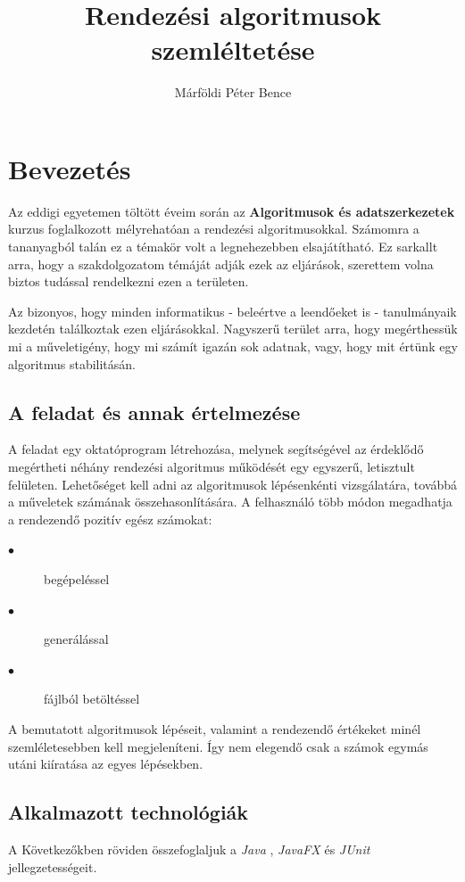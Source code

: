 \documentclass{elteikthesis}
\title{Rendezési algoritmusok szemléltetése}
\author{Márföldi Péter Bence}
\begin{document}
\frontmatter

	\maketitle
	\renewcommand{\thepage}{}
	\tableofcontents
	
\mainmatter
	\pagestyle{fancy}

\chapter{Bevezetés} 
 Az eddigi egyetemen töltött éveim során az \textbf{Algoritmusok és adatszerkezetek} kurzus foglalkozott mélyrehatóan a rendezési algoritmusokkal. Számomra a tananyagból talán ez a témakör volt a legnehezebben elsajátítható. Ez sarkallt arra, hogy a szakdolgozatom témáját adják ezek az eljárások, szerettem volna biztos tudással rendelkezni ezen a területen.\par
 Az bizonyos, hogy minden informatikus - beleértve a leendőeket is - tanulmányaik kezdetén találkoztak ezen eljárásokkal. Nagyszerű terület arra, hogy megérthessük mi a műveletigény, hogy mi számít igazán sok adatnak, vagy, hogy mit értünk egy algoritmus stabilitásán.\par

\section{A feladat és annak értelmezése}
A feladat egy oktatóprogram létrehozása, melynek segítségével az érdeklődő megértheti néhány rendezési algoritmus működését egy egyszerű, letisztult felületen. Lehetőséget kell adni az algoritmusok lépésenkénti vizsgálatára, továbbá a műveletek számának összehasonlítására. A felhasználó több módon megadhatja a rendezendő pozitív egész számokat:
\begin{description}
	\item[$\bullet$] begépeléssel
	\item[$\bullet$] generálással
	\item[$\bullet$] fájlból betöltéssel
\end{description}\par
A bemutatott algoritmusok lépéseit, valamint a rendezendő értékeket minél szemléletesebben kell megjeleníteni. Így nem elegendő csak a számok egymás utáni kiíratása az egyes lépésekben.

\section{Alkalmazott technológiák}
A Következőkben röviden összefoglaljuk a \emph{Java} \cite{Java}, \emph{JavaFX} \cite{JavaFX} és \emph{JUnit} \cite{JUnit} jellegzetességeit.
\end{document}
